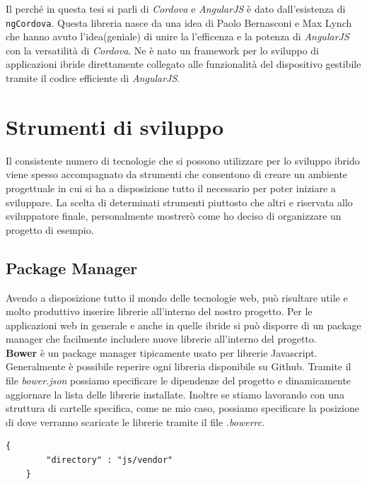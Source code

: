 Il perché in questa tesi si parli di \emph{Cordova} e \emph{AngularJS} è dato dall'esistenza di \texttt{ngCordova}. Questa libreria nasce da una idea di Paolo Bernasconi e Max Lynch che hanno avuto l'idea(geniale) di unire la l'efficenza e la potenza di \emph{AngularJS} con la versatilità di \emph{Cordova}. Ne è nato un framework per lo sviluppo di applicazioni ibride direttamente collegato alle funzionalità del dispositivo gestibile tramite il codice efficiente di \emph{AngularJS}.\\

\section{Strumenti di sviluppo}

Il consistente numero di tecnologie che si possono utilizzare per lo sviluppo ibrido viene spesso accompagnato da strumenti che consentono di creare un ambiente progettuale in cui si ha a disposizione tutto il necessario per poter iniziare a sviluppare. La scelta di determinati strumenti piuttosto che altri e riservata allo sviluppatore finale, personalmente mostrerò come ho deciso di organizzare un progetto di esempio.

\subsection{Package Manager}

Avendo a disposizione tutto il mondo delle tecnologie web, può risultare utile e molto produttivo inserire librerie all'interno del nostro progetto. Per le applicazioni web in generale e anche in quelle ibride si può disporre di un package manager che facilmente includere nuove librerie all'interno del progetto.\\

\textbf{Bower} è un package manager tipicamente usato per librerie Javascript. Generalmente è possibile reperire ogni libreria disponibile su Github. Tramite il file \emph{bower.json} possiamo specificare le dipendenze del progetto e dinamicamente aggiornare la lista delle librerie installate. Inoltre se stiamo lavorando con una struttura di cartelle specifica, come ne mio caso, possiamo specificare la posizione di dove verranno scaricate le librerie tramite il file \emph{.bowerrc}. 

\begin{lstlisting}[language=html,caption={Una tipica configurazione del file .bowerrc},
				   label={lst:bowerrc}]
	{
		"directory" : "js/vendor"
	}
\end{lstlisting}

